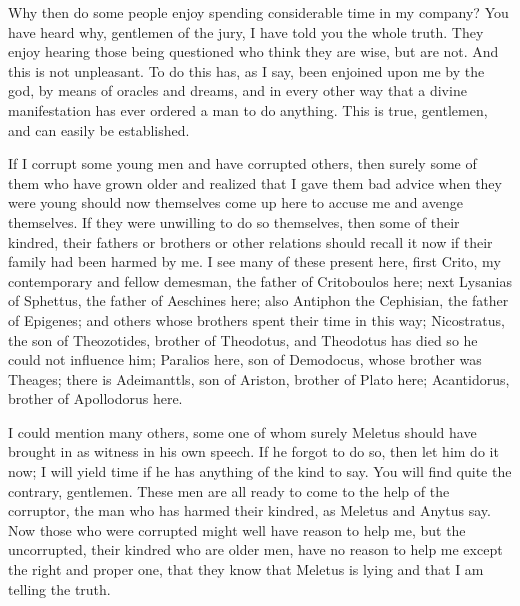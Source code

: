 Why then do some people enjoy spending considerable time in my company? You have heard
why, gentlemen of the jury, I have told you the whole truth. They enjoy hearing those being
questioned who think they are wise, but are not. And this is not unpleasant. To do this has, as I say,
been enjoined upon me by the god, by means of oracles and dreams, and in every other way that
a divine manifestation has ever ordered a man to do anything. This is true, gentlemen, and can
easily be established.

If I corrupt some young men and have corrupted others, then surely some of them who have
grown older and realized that I gave them bad advice when they were young should now
themselves come up here to accuse me and avenge themselves. If they were unwilling to do so
themselves, then some of their kindred, their fathers or brothers or other relations should recall it
now if their family had been harmed by me. I see many of these present here, first Crito, my
contemporary and fellow demesman, the father of Critoboulos here; next Lysanias of Sphettus, the
father of Aeschines here; also Antiphon the Cephisian, the father of Epigenes; and others whose
brothers spent their time in this way; Nicostratus, the son of Theozotides, brother of Theodotus,
and Theodotus has died so he could not influence him; Paralios here, son of Demodocus, whose
brother was Theages; there is Adeimanttls, son of Ariston, brother of Plato here; Acantidorus,
brother of Apollodorus here.

I could mention many others, some one of whom surely Meletus should have brought in as
witness in his own speech. If he forgot to do so, then let him do it now; I will yield time if he has
anything of the kind to say. You will find quite the contrary, gentlemen. These men are all ready
to come to the help of the corruptor, the man who has harmed their kindred, as Meletus and Anytus
say. Now those who were corrupted might well have reason to help me, but the uncorrupted, their
kindred who are older men, have no reason to help me except the right and proper one, that they
know that Meletus is lying and that I am telling the truth.

